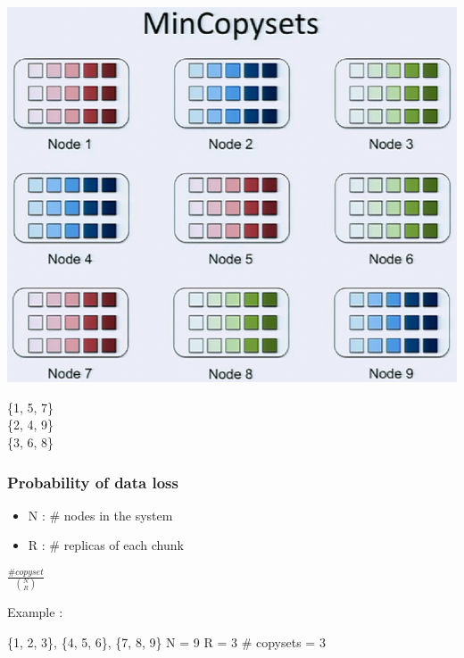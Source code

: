 \documentclass[xcolor=table]{beamer}
\begin{document}
	\begin{frame}
		\begin{minipage}[b]{0.69\linewidth}
			\centering
			
			\includegraphics[width=1\textwidth]{4.png}
		\end{minipage}
		\begin{minipage}[b]{0.29\linewidth}
			\begin{center}
				\alert{	\{1, 5, 7\}\\
						\{2, 4, 9\}\\
						\{3, 6, 8\} }
			\end{center}
		\end{minipage}
	\end{frame}

	\begin{frame}
		\frametitle{Probability of data loss}
		\begin{minipage}[h]{0.49\linewidth}
			\centering
			\small
			\begin{itemize}
				\item N : \# nodes in the system
				\item R : \# replicas of each chunk
			\end{itemize}
		\end{minipage}
		\begin{minipage}[h]{0.49\linewidth}
			\centering
			\Huge
			$\frac{\# copyset}{\binom{N}{R}}$
		\end{minipage}
		\newline
		\newline
		Example :
		\begin{center}
			\alert{\{1, 2, 3\}, \{4, 5, 6\}, \{7, 8, 9\}}
			\newline
			\newline
			N = 9\newline
			R = 3
			\newline
			\newline
			\# copysets = 3
			\newline
		\end{center}
	\end{frame}
\end{document}
